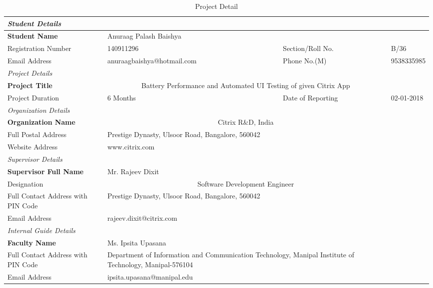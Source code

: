 \captionsetup[table]{list=no}
\begin{table}
\begin{scriptsize}
\caption{Project Detail}
\begin{tabularx}{\linewidth}{|m| b| m| m|}

\multicolumn{4}{l}{\textit{Student Details}}\\ 
\hline
\textbf{Student Name}&\multicolumn{2}{p{8cm}}{Anuraag Palash Baishya}&\\ \hline
Registration Number&140911296&Section/Roll No.& B/36\\ \hline
Email Address&{anuraagbaishya@hotmail.com}&Phone No.(M)&9538335985 \\  \hline

\multicolumn{4}{l}{\textit{Project Details}}\\ \hline
\textbf{Project Title}&\multicolumn{2}{c}{Battery Performance and Automated UI Testing of given Citrix App}& \\ \hline
Project Duration& 6 Months&Date of Reporting& 02-01-2018 \\ \hline

\multicolumn{4}{l}{\textit{Organization Details}}\\ \hline
\textbf{Organization Name}&\multicolumn{2}{c}{Citrix R\&D, India}& \\ \hline
Full Postal Address&\multicolumn{2}{p{8cm}}{Prestige Dynasty, Ulsoor Road, Bangalore, 560042} &\\ \hline
Website Address&\multicolumn{2}{X}{www.citrix.com} &\\ \hline

\multicolumn{4}{l}{\textit{Supervisor Details}}\\ \hline
\textbf{Supervisor Full Name}&\multicolumn{2}{X}{Mr. Rajeev Dixit}& \\ \hline
Designation&\multicolumn{2}{c}{Software Development Engineer} &\\ \hline
Full Contact Address with PIN Code&\multicolumn{2}{p{8cm}}{Prestige Dynasty, Ulsoor Road, Bangalore, 560042}& \\ \hline
Email Address&\multicolumn{2}{p{8cm}}{rajeev.dixit@citrix.com}&\\ \hline

\multicolumn{4}{l}{\textit{Internal Guide Details}}\\ \hline
\textbf{Faculty Name}&\multicolumn{2}{X}{Ms. Ipsita Upasana} &\\ \hline
Full Contact Address with PIN Code&\multicolumn{2}{p{8cm}}{Department of Information and Communication Technology,  Manipal Institute of Technology, Manipal-576104}& \\ \hline
Email Address&\multicolumn{2}{p{8cm}}{ipsita.upasana@manipal.edu}&\\  \hline
\end{tabularx}
\end{scriptsize}
\end{table}